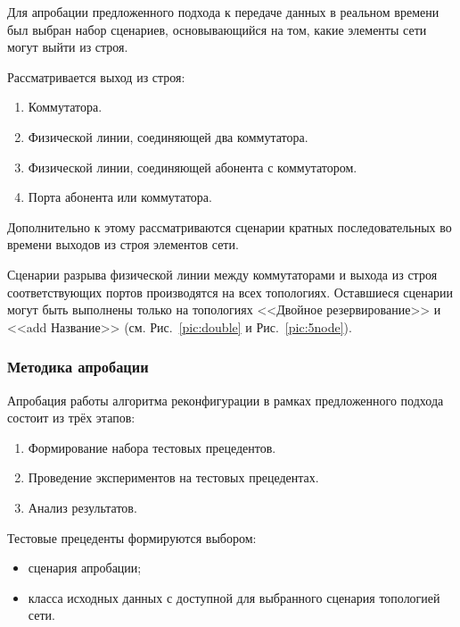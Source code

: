 \documentclass[12pt, a4paper]{article}
\begin{document}
Для апробации предложенного подхода к передаче данных в реальном времени был выбран набор сценариев, основывающийся на том, какие элементы сети могут выйти из строя. 

Рассматривается выход из строя:
\begin{enumerate}
	\item Коммутатора.
	\item Физической линии, соединяющей два коммутатора.
	\item Физической линии, соединяющей абонента с коммутатором.
	\item Порта абонента или коммутатора.
\end{enumerate}

Дополнительно к этому рассматриваются сценарии кратных последовательных во времени выходов из строя элементов сети.

Сценарии разрыва физической линии между коммутаторами и выхода из строя соответствующих портов производятся на всех топологиях. Оставшиеся сценарии могут быть выполнены только на топологиях <<Двойное резервирование>> и <<add Название>> (см. Рис.~\ref{pic:double} и Рис.~\ref{pic:5node}).

\subsubsection{Методика апробации}
Апробация работы алгоритма реконфигурации в рамках предложенного подхода состоит из трёх этапов:
\begin{enumerate}
	\item Формирование набора тестовых прецедентов.
	\item Проведение экспериментов на тестовых прецедентах.
	\item Анализ результатов.
\end{enumerate}

Тестовые прецеденты формируются выбором:
\begin{itemize}
	\item сценария апробации;
	\item класса исходных данных с доступной для выбранного сценария топологией сети.
\end{itemize}
\end{document}
